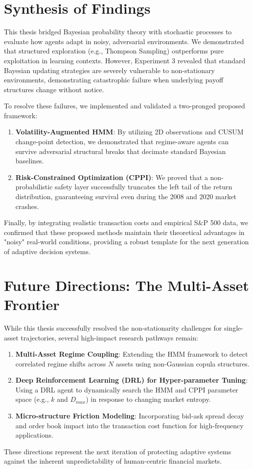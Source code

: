 \section{Synthesis of Findings}
This thesis bridged Bayesian probability theory with stochastic processes to evaluate how agents adapt in noisy, adversarial environments. We demonstrated that structured exploration (e.g., Thompson Sampling) outperforms pure exploitation in learning contexts. However, Experiment 3 revealed that standard Bayesian updating strategies are severely vulnerable to non-stationary environments, demonstrating catastrophic failure when underlying payoff structures change without notice.

To resolve these failures, we implemented and validated a two-pronged proposed framework:
\begin{enumerate}
    \item \textbf{Volatility-Augmented HMM}: By utilizing 2D observations and CUSUM change-point detection, we demonstrated that regime-aware agents can survive adversarial structural breaks that decimate standard Bayesian baselines.
    \item \textbf{Risk-Constrained Optimization (CPPI)}: We proved that a non-probabilistic safety layer successfully truncates the left tail of the return distribution, guaranteeing survival even during the 2008 and 2020 market crashes.
\end{enumerate}

Finally, by integrating realistic transaction costs and empirical S\&P 500 data, we confirmed that these proposed methods maintain their theoretical advantages in "noisy" real-world conditions, providing a robust template for the next generation of adaptive decision systems.

\section{Future Directions: The Multi-Asset Frontier}
While this thesis successfully resolved the non-stationarity challenges for single-asset trajectories, several high-impact research pathways remain:
\begin{enumerate}
    \item \textbf{Multi-Asset Regime Coupling}: Extending the HMM framework to detect correlated regime shifts across $N$ assets using non-Gaussian copula structures.
    \item \textbf{Deep Reinforcement Learning (DRL) for Hyper-parameter Tuning}: Using a DRL agent to dynamically search the HMM and CPPI parameter space (e.g., $k$ and $D_{max}$) in response to changing market entropy.
    \item \textbf{Micro-structure Friction Modeling}: Incorporating bid-ask spread decay and order book impact into the transaction cost function for high-frequency applications.
\end{enumerate}

These directions represent the next iteration of protecting adaptive systems against the inherent unpredictability of human-centric financial markets.

